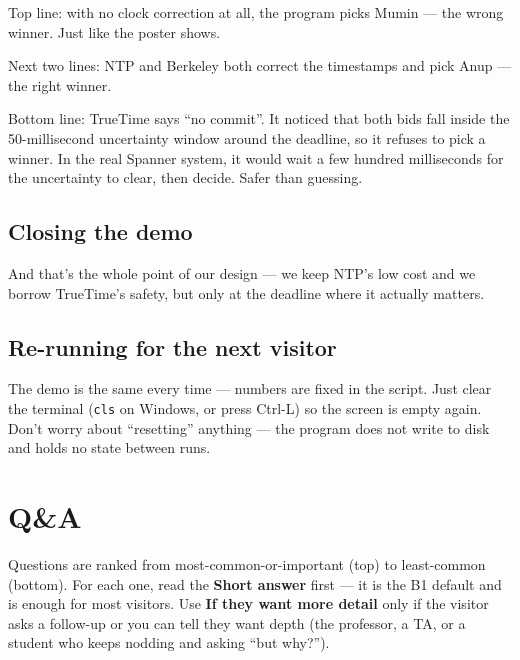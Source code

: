\documentclass[a4paper,11pt]{article}
\begin{document}
\begin{spoken}
Top line: with no clock correction at all, the program picks
Mumin --- the wrong winner. Just like the poster shows.

Next two lines: NTP and Berkeley both correct the timestamps and
pick Anup --- the right winner.

Bottom line: TrueTime says ``no commit''. It noticed that both
bids fall inside the 50-millisecond uncertainty window around the
deadline, so it refuses to pick a winner. In the real Spanner
system, it would wait a few hundred milliseconds for the
uncertainty to clear, then decide. Safer than guessing.
\end{spoken}

\subsection*{Closing the demo}

\begin{spoken}
And that's the whole point of our design --- we keep NTP's low
cost and we borrow TrueTime's safety, but only at the deadline
where it actually matters.
\end{spoken}

\subsection*{Re-running for the next visitor}

The demo is the same every time --- numbers are fixed in the
script. Just clear the terminal (\texttt{cls} on Windows, or
press Ctrl-L) so the screen is empty again. Don't worry about
``resetting'' anything --- the program does not write to disk and
holds no state between runs.

\newpage

\section{Q\&A}\label{sec:qa}

Questions are ranked from most-common-or-important (top) to
least-common (bottom). For each one, read the \textbf{Short
answer} first --- it is the B1 default and is enough for most
visitors. Use \textbf{If they want more detail} only if the
visitor asks a follow-up or you can tell they want depth (the
professor, a TA, or a student who keeps nodding and asking
``but why?'').
\end{document}
